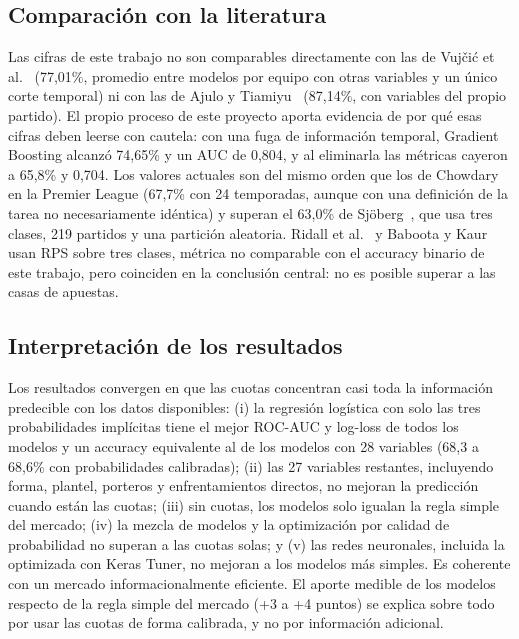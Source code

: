 \documentclass{ieeeaccess}
\begin{document}
\subsection{Comparación con la literatura}
Las cifras de este trabajo no son comparables directamente con las de Vujčić et al.~\cite{vujcic2026supervised} (77,01\%, promedio entre modelos por equipo con otras variables y un único corte temporal) ni con las de Ajulo y Tiamiyu~\cite{ajulo2026ml} (87,14\%, con variables del propio partido). El propio proceso de este proyecto aporta evidencia de por qué esas cifras deben leerse con cautela: con una fuga de información temporal, Gradient Boosting alcanzó 74,65\% y un AUC de 0,804, y al eliminarla las métricas cayeron a 65,8\% y 0,704. Los valores actuales son del mismo orden que los de Chowdary~\cite{chowdary2026dynamic} en la Premier League (67,7\% con 24 temporadas, aunque con una definición de la tarea no necesariamente idéntica) y superan el 63,0\% de Sjöberg~\cite{sjoborg2023football}, que usa tres clases, 219 partidos y una partición aleatoria. Ridall et al.~\cite{ridall2025bayesian} y Baboota y Kaur~\cite{baboota2019predictive} usan RPS sobre tres clases, métrica no comparable con el accuracy binario de este trabajo, pero coinciden en la conclusión central: no es posible superar a las casas de apuestas.

\subsection{Interpretación de los resultados}
Los resultados convergen en que las cuotas concentran casi toda la información predecible con los datos disponibles: (i) la regresión logística con solo las tres probabilidades implícitas tiene el mejor ROC-AUC y log-loss de todos los modelos y un accuracy equivalente al de los modelos con 28 variables (68,3 a 68,6\% con probabilidades calibradas); (ii) las 27 variables restantes, incluyendo forma, plantel, porteros y enfrentamientos directos, no mejoran la predicción cuando están las cuotas; (iii) sin cuotas, los modelos solo igualan la regla simple del mercado; (iv) la mezcla de modelos y la optimización por calidad de probabilidad no superan a las cuotas solas; y (v) las redes neuronales, incluida la optimizada con Keras Tuner, no mejoran a los modelos más simples. Es coherente con un mercado informacionalmente eficiente. El aporte medible de los modelos respecto de la regla simple del mercado (+3 a +4 puntos) se explica sobre todo por usar las cuotas de forma calibrada, y no por información adicional.
\end{document}
